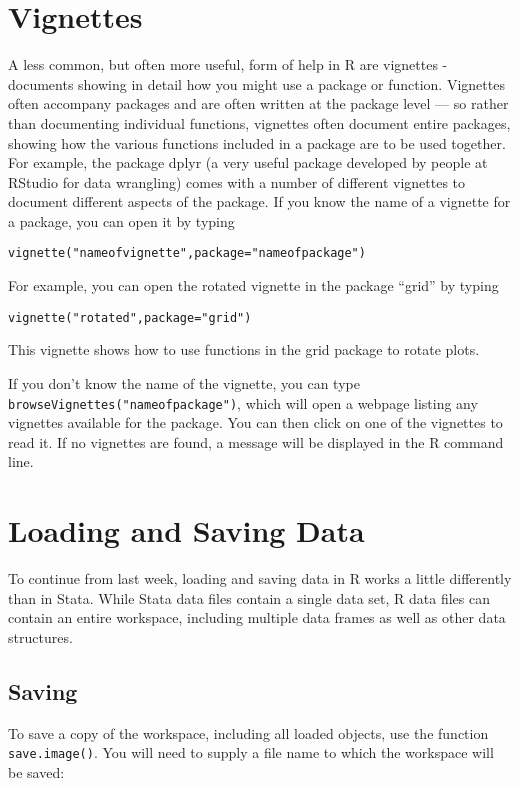 \documentclass[12pt, oneside]{amsart}   	%
\begin{document}
\section{Vignettes}

A less common, but often more useful, form of help in R are vignettes - documents showing in detail how you might use a package or function. Vignettes often accompany packages and are often written at the package level --- so rather than documenting individual functions, vignettes often document entire packages, showing how the various functions included in a package are to be used together. For example, the package dplyr (a very useful package developed by people at RStudio for data wrangling) comes with a number of different vignettes to document different aspects of the package. If you know the name of a vignette for a package, you can open it by typing 

\texttt{vignette("nameofvignette",package="nameofpackage")} 

For example, you can open the rotated vignette in the package ``grid'' by typing 

\texttt{vignette("rotated",package="grid")} 

This vignette shows how to use functions in the grid package to rotate plots. 

If you don't know the name of the vignette, you can type \texttt{browseVignettes("nameofpackage")}, which will open a webpage listing any vignettes available for the package. You can then click on one of the vignettes to read it. If no vignettes are found, a message will be displayed in the R command line. 

\section{Loading and Saving Data}

To continue from last week, loading and saving data in R works a little differently than in Stata. While Stata data files contain a single data set, R data files can contain an entire workspace, including multiple data frames as well as other data structures. 

\subsection{Saving}

To save a copy of the workspace, including all loaded objects, use the function \texttt{save.image()}. You will need to supply a file name to which the workspace will be saved:
\end{document}
